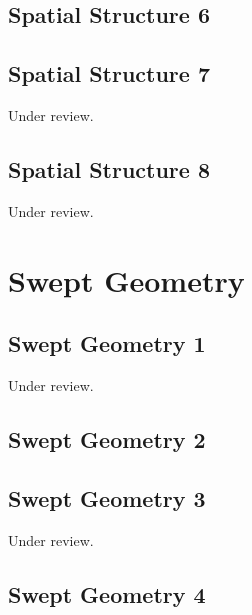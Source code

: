 \documentclass{scrartcl}
\begin{document}
\subsection{Spatial Structure 6}
\label{sec:spatial_6}
\clearpage

\subsection{Spatial Structure 7} %
\label{sec:spatial_7}
Under review.%
\clearpage

\subsection{Spatial Structure 8} %
\label{sec:spatial_8}
Under review.%
\clearpage

\section{Swept Geometry}
\label{sec:swept_geometry}


\subsection{Swept Geometry 1} %
\label{sec:swept_1}
Under review.%
\clearpage

\subsection{Swept Geometry 2} %
\label{sec:swept_2}
\clearpage

\subsection{Swept Geometry 3} %
\label{sec:swept_3}
Under review.%
\clearpage

\subsection{Swept Geometry 4} %
\label{sec:swept_4}
\clearpage
\end{document}
